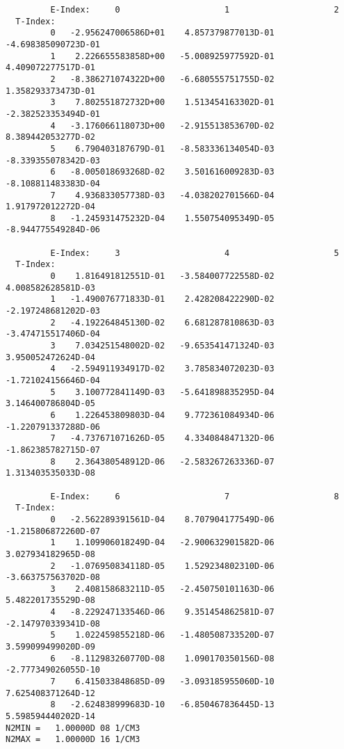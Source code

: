 \documentclass[12pt,dvipdfmx]{article}
\begin{document}
{\begin{small}\begin{verbatim}
         E-Index:     0                     1                     2
  T-Index:
         0   -2.956247006586D+01    4.857379877013D-01   -4.698385090723D-01
         1    2.226655583858D+00   -5.008925977592D-01    4.409072277517D-01
         2   -8.386271074322D+00   -6.680555751755D-02    1.358293373473D-01
         3    7.802551872732D+00    1.513454163302D-01   -2.382523353494D-01
         4   -3.176066118073D+00   -2.915513853670D-02    8.389442053277D-02
         5    6.790403187679D-01   -8.583336134054D-03   -8.339355078342D-03
         6   -8.005018693268D-02    3.501616009283D-03   -8.108811483383D-04
         7    4.936833057738D-03   -4.038202701566D-04    1.917972012272D-04
         8   -1.245931475232D-04    1.550754095349D-05   -8.944775549284D-06

         E-Index:     3                     4                     5
  T-Index:
         0    1.816491812551D-01   -3.584007722558D-02    4.008582628581D-03
         1   -1.490076771833D-01    2.428208422290D-02   -2.197248681202D-03
         2   -4.192264845130D-02    6.681287810863D-03   -3.474715517406D-04
         3    7.034251548002D-02   -9.653541471324D-03    3.950052472624D-04
         4   -2.594911934917D-02    3.785834072023D-03   -1.721024156646D-04
         5    3.100772841149D-03   -5.641898835295D-04    3.146400786804D-05
         6    1.226453809803D-04    9.772361084934D-06   -1.220791337288D-06
         7   -4.737671071626D-05    4.334084847132D-06   -1.862385782715D-07
         8    2.364380548912D-06   -2.583267263336D-07    1.313403535033D-08

         E-Index:     6                     7                     8
  T-Index:
         0   -2.562289391561D-04    8.707904177549D-06   -1.215806872260D-07
         1    1.109906018249D-04   -2.900632901582D-06    3.027934182965D-08
         2   -1.076950834118D-05    1.529234802310D-06   -3.663757563702D-08
         3    2.408158683211D-05   -2.450750101163D-06    5.482201735529D-08
         4   -8.229247133546D-06    9.351454862581D-07   -2.147970339341D-08
         5    1.022459855218D-06   -1.480508733520D-07    3.599099499020D-09
         6   -8.112983260770D-08    1.090170350156D-08   -2.777349026055D-10
         7    6.415033848685D-09   -3.093185955060D-10    7.625408371264D-12
         8   -2.624838999683D-10   -6.850467836445D-13    5.598594440202D-14
N2MIN =   1.00000D 08 1/CM3
N2MAX =   1.00000D 16 1/CM3


\end{verbatim}
\end{small}}
\end{document}
